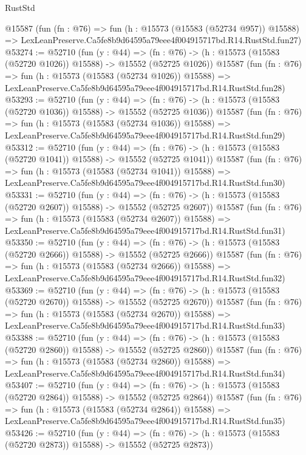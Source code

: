 \begin{lexlean}{RustStd}
\begin{coremodule}
    @15587
    (fun (fn : @76) =>
    fun (h : @15573 (@15583 (@52734 @957)) @15588) =>
    LexLeanPreserve.Ca5fe8b9d64595a79eee4f004915717bd.R14.RustStd.fun27)
@53274 := @52710
    (fun (y : @44) =>
    (fn : @76) -> (h : @15573 (@15583 (@52720 @1026)) @15588) -> @15552 (@52725 @1026))
    @15587
    (fun (fn : @76) =>
    fun (h : @15573 (@15583 (@52734 @1026)) @15588) =>
    LexLeanPreserve.Ca5fe8b9d64595a79eee4f004915717bd.R14.RustStd.fun28)
@53293 := @52710
    (fun (y : @44) =>
    (fn : @76) -> (h : @15573 (@15583 (@52720 @1036)) @15588) -> @15552 (@52725 @1036))
    @15587
    (fun (fn : @76) =>
    fun (h : @15573 (@15583 (@52734 @1036)) @15588) =>
    LexLeanPreserve.Ca5fe8b9d64595a79eee4f004915717bd.R14.RustStd.fun29)
@53312 := @52710
    (fun (y : @44) =>
    (fn : @76) -> (h : @15573 (@15583 (@52720 @1041)) @15588) -> @15552 (@52725 @1041))
    @15587
    (fun (fn : @76) =>
    fun (h : @15573 (@15583 (@52734 @1041)) @15588) =>
    LexLeanPreserve.Ca5fe8b9d64595a79eee4f004915717bd.R14.RustStd.fun30)
@53331 := @52710
    (fun (y : @44) =>
    (fn : @76) -> (h : @15573 (@15583 (@52720 @2607)) @15588) -> @15552 (@52725 @2607))
    @15587
    (fun (fn : @76) =>
    fun (h : @15573 (@15583 (@52734 @2607)) @15588) =>
    LexLeanPreserve.Ca5fe8b9d64595a79eee4f004915717bd.R14.RustStd.fun31)
@53350 := @52710
    (fun (y : @44) =>
    (fn : @76) -> (h : @15573 (@15583 (@52720 @2666)) @15588) -> @15552 (@52725 @2666))
    @15587
    (fun (fn : @76) =>
    fun (h : @15573 (@15583 (@52734 @2666)) @15588) =>
    LexLeanPreserve.Ca5fe8b9d64595a79eee4f004915717bd.R14.RustStd.fun32)
@53369 := @52710
    (fun (y : @44) =>
    (fn : @76) -> (h : @15573 (@15583 (@52720 @2670)) @15588) -> @15552 (@52725 @2670))
    @15587
    (fun (fn : @76) =>
    fun (h : @15573 (@15583 (@52734 @2670)) @15588) =>
    LexLeanPreserve.Ca5fe8b9d64595a79eee4f004915717bd.R14.RustStd.fun33)
@53388 := @52710
    (fun (y : @44) =>
    (fn : @76) -> (h : @15573 (@15583 (@52720 @2860)) @15588) -> @15552 (@52725 @2860))
    @15587
    (fun (fn : @76) =>
    fun (h : @15573 (@15583 (@52734 @2860)) @15588) =>
    LexLeanPreserve.Ca5fe8b9d64595a79eee4f004915717bd.R14.RustStd.fun34)
@53407 := @52710
    (fun (y : @44) =>
    (fn : @76) -> (h : @15573 (@15583 (@52720 @2864)) @15588) -> @15552 (@52725 @2864))
    @15587
    (fun (fn : @76) =>
    fun (h : @15573 (@15583 (@52734 @2864)) @15588) =>
    LexLeanPreserve.Ca5fe8b9d64595a79eee4f004915717bd.R14.RustStd.fun35)
@53426 := @52710
    (fun (y : @44) =>
    (fn : @76) -> (h : @15573 (@15583 (@52720 @2873)) @15588) -> @15552 (@52725 @2873))

\end{coremodule}
\end{lexlean}
